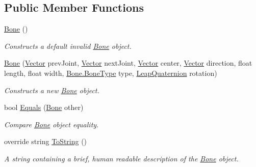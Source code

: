\subsection*{Public Member Functions}
\begin{DoxyCompactItemize}
\item 
\mbox{\hyperlink{class_leap_1_1_bone_aa9d04e2a54120f2981563db7cdf2a401}{Bone}} ()
\begin{DoxyCompactList}\small\item\em Constructs a default invalid \mbox{\hyperlink{class_leap_1_1_bone}{Bone}} object. \end{DoxyCompactList}\item 
\mbox{\hyperlink{class_leap_1_1_bone_adf72dc85b5d6205d225a7b5b72e2cb9e}{Bone}} (\mbox{\hyperlink{struct_leap_1_1_vector}{Vector}} prev\+Joint, \mbox{\hyperlink{struct_leap_1_1_vector}{Vector}} next\+Joint, \mbox{\hyperlink{struct_leap_1_1_vector}{Vector}} center, \mbox{\hyperlink{struct_leap_1_1_vector}{Vector}} direction, float length, float width, \mbox{\hyperlink{class_leap_1_1_bone_a21054e31cefa7b75f25a026006fdbb1b}{Bone.\+Bone\+Type}} type, \mbox{\hyperlink{struct_leap_1_1_leap_quaternion}{Leap\+Quaternion}} rotation)
\begin{DoxyCompactList}\small\item\em Constructs a new \mbox{\hyperlink{class_leap_1_1_bone}{Bone}} object. \end{DoxyCompactList}\item 
bool \mbox{\hyperlink{class_leap_1_1_bone_a12466a8894f026da28e3ff013f305e0d}{Equals}} (\mbox{\hyperlink{class_leap_1_1_bone}{Bone}} other)
\begin{DoxyCompactList}\small\item\em Compare \mbox{\hyperlink{class_leap_1_1_bone}{Bone}} object equality. \end{DoxyCompactList}\item 
override string \mbox{\hyperlink{class_leap_1_1_bone_a989b912919381795458a53dcb01dae74}{To\+String}} ()
\begin{DoxyCompactList}\small\item\em A string containing a brief, human readable description of the \mbox{\hyperlink{class_leap_1_1_bone}{Bone}} object. \end{DoxyCompactList}\end{DoxyCompactItemize}

